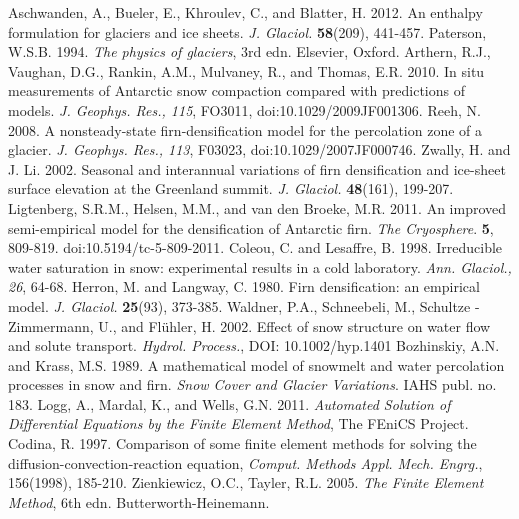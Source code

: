 \documentclass{article}%
\begin{document}
\begin{thebibliography}{1}

  Aschwanden, A., Bueler, E., Khroulev, C., and Blatter, H. 2012. An enthalpy formulation for glaciers and ice sheets. \textit{J. Glaciol.} \textbf{58}(209), 441\mbox{-}457.
  Paterson, W.S.B. 1994. \textit{The physics of glaciers}, 3rd edn. Elsevier, Oxford.
  Arthern, R.J., Vaughan, D.G., Rankin, A.M., Mulvaney, R., and Thomas, E.R. 2010. In situ measurements of Antarctic snow compaction compared with predictions of models. \textit{J. Geophys. Res., 115}, FO3011, doi:10.1029/2009JF001306.
  Reeh, N. 2008. A nonsteady\mbox{-}state firn\mbox{-}densification model for the percolation zone of a glacier. \textit{J. Geophys. Res., 113}, F03023, doi:10.1029/2007JF000746.
  Zwally, H. and J. Li. 2002. Seasonal and interannual variations of firn densification and ice\mbox{-}sheet surface elevation at the Greenland summit. \textit{J. Glaciol.} \textbf{48}(161), 199\mbox{-}207.
  Ligtenberg, S.R.M., Helsen, M.M., and van den Broeke, M.R. 2011. An improved semi\mbox{-}empirical model for the densification of Antarctic firn. \textit{The Cryosphere}. \textbf{5}, 809\mbox{-}819. doi:10.5194/tc\mbox{-}5\mbox{-}809\mbox{-}2011.
  \bibitem{}Coleou, C. and Lesaffre, B. 1998. Irreducible water saturation in snow: experimental results in a cold laboratory. \textit{Ann. Glaciol., 26}, 64\mbox{-}68.
  Herron, M. and Langway, C. 1980. Firn densification: an empirical model. \textit{J. Glaciol.} \textbf{25}(93), 373\mbox{-}385.
  Waldner, P.A., Schneebeli, M., Schultze \mbox{-} Zimmermann, U., and Fl\"{u}hler, H. 2002. Effect of snow structure on water flow and solute transport. \textit{Hydrol. Process.}, DOI: 10.1002/hyp.1401
  Bozhinskiy, A.N. and Krass, M.S. 1989. A mathematical model of snowmelt and water percolation processes in snow and firn. \textit{Snow Cover and Glacier Variations}. IAHS publ. no. 183.
  Logg, A., Mardal, K., and Wells, G.N. 2011. \textit{Automated Solution of Differential Equations by the Finite Element Method}, The FEniCS Project.
  Codina, R. 1997. Comparison of some finite element methods for solving the diffusion\mbox{-}convection\mbox{-}reaction equation, \textit{Comput. Methods Appl. Mech. Engrg.}, 156(1998), 185\mbox{-}210.
  Zienkiewicz, O.C., Tayler, R.L. 2005. \textit{The Finite Element Method}, 6th edn. Butterworth\mbox{-}Heinemann.
\end{thebibliography}
\end{document}
